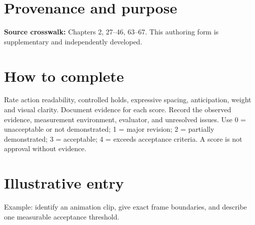 \documentclass[10pt,letterpaper]{article}
\begin{document}
\makedoctitle
\makedocsummary

\section{Provenance and purpose}
\textbf{Source crosswalk:} Chapters 2, 27--46, 63--67. This authoring form is supplementary and independently developed.
\section{How to complete}
Rate action readability, controlled holds, expressive spacing, anticipation, weight and visual clarity. Document evidence for each score. Record the observed evidence, measurement environment, evaluator, and unresolved issues. Use 0 = unacceptable or not demonstrated; 1 = major revision; 2 = partially demonstrated; 3 = acceptable; 4 = exceeds acceptance criteria. A score is not approval without evidence.
\section{Illustrative entry}
Example: identify an animation clip, give exact frame boundaries, and describe one measurable acceptance threshold.
\end{document}
